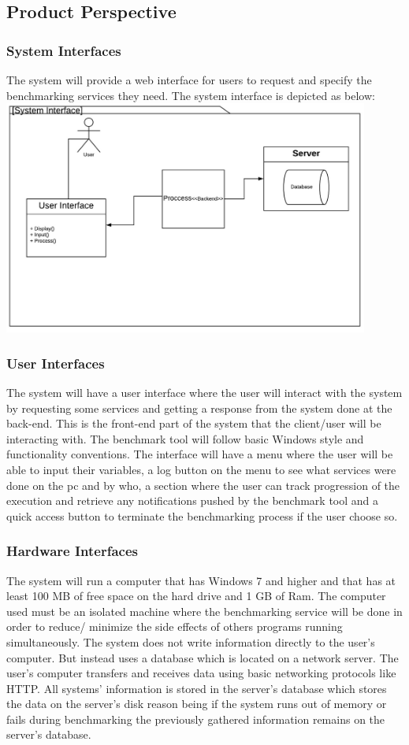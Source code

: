 \documentclass[a4paper,12pt]{article}
\begin{document}
\subsection{Product Perspective}

\subsubsection{System Interfaces}
The system will provide a web interface for users to request and specify the benchmarking services they need. The system interface is depicted as below:\\
\includegraphics[width=12cm]{SI.jpeg}
\subsubsection{User Interfaces}
The system will have a user interface where the user will interact with the system by requesting some services and getting a response from the system done at the back-end. This is the front-end part of the system that the client/user will be interacting with. The benchmark tool will follow basic Windows style and functionality conventions. The interface will have a menu where the user will be able to input their variables, a log button on the menu to see what services were done on the pc and by who, a section where the user can track progression of the execution and retrieve any notifications pushed by the benchmark tool and a quick access button to terminate the benchmarking process if the user choose so. 
\subsubsection{Hardware Interfaces}
The system will run a computer that has Windows 7 and higher and that has at least 100 MB of free space on the hard drive and 1 GB of Ram. The computer used must be an isolated machine where the benchmarking service will be done in order to reduce/ minimize the side effects of others programs running simultaneously. The system does not write information directly to the user's computer. But instead uses a database which is located on a network server. The user's computer transfers and receives data using basic networking protocols like HTTP. All systems' information is stored in the server's database which stores the data on the server's disk reason being if the system runs out of memory or fails during benchmarking the previously gathered information remains on the server's database.
\end{document}
